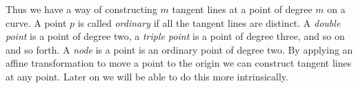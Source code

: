 Thus we have a way of constructing $m$ tangent lines at a point of degree $m$ on a curve. A point $p$ is called \emph{ordinary} if all the tangent lines are distinct. A \emph{double point} is a point of degree two, a \emph{triple point} is a point of degree three, and so on and so forth. A \emph{node} is a point is an ordinary point of degree two. By applying an affine transformation to move a point to the origin we can construct tangent lines at any point. Later on we will be able to do this more intrinsically.


